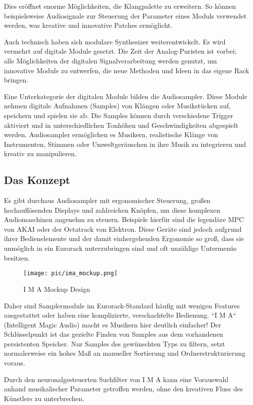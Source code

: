 	Dies eröffnet enorme Möglichkeiten, die Klangpalette zu erweitern. So können beispielsweise Audiosignale zur Steuerung der Parameter eines Moduls verwendet werden, was kreative und innovative Patches ermöglicht.
	
	Auch technisch haben sich modulare Synthesizer weiterentwickelt. 
	Es wird vermehrt auf digitale Module gesetzt. 
	Die Zeit der Analog-Puristen ist vorbei; alle Möglichkeiten der digitalen Signalverarbeitung werden genutzt, um innovative Module zu entwerfen, die neue Methoden und Ideen in das eigene Rack bringen.
	
	Eine Unterkategorie der digitalen Module bilden die Audiosampler. Diese Module nehmen digitale Aufnahmen (Samples) von Klängen oder Musikstücken auf, speichern und spielen sie ab. Die Samples können durch verschiedene Trigger aktiviert und in unterschiedlichen Tonhöhen und Geschwindigkeiten abgespielt werden. 
	Audiosampler ermöglichen es Musikern, realistische Klänge von Instrumenten, Stimmen oder Umweltgeräuschen in ihre Musik zu integrieren und kreativ zu manipulieren.
	
	\newpage
	\subsection{Das Konzept}
	
	Es gibt durchaus Audiosampler mit ergonomischer Steuerung, großen hochauflösenden Displays und zahlreichen Knöpfen, um diese komplexen Audiomaschinen angenehm zu steuern. 
	Beispiele hierfür sind die legendäre MPC von AKAI oder der Octatrack von Elektron. 
	Diese Geräte sind jedoch aufgrund ihrer Bedienelemente und der damit einhergehenden Ergonomie so groß, dass sie unmöglich in ein Eurorack unterzubringen sind und oft unzählige Untermenüs besitzen.
	
	\begin{wrapfigure}{r}{0.4\textwidth} %
		\vspace{-20pt + 0.02\textwidth}
		\hspace{0.02\textwidth} %
		\texttt{[image: pic/ima\_mockup.png]} %
		\caption{I M A Mockup Design}
		\vspace{-20pt}
	\end{wrapfigure}

	Daher sind Samplermodule im Eurorack-Standard häufig mit wenigen Features ausgestattet oder haben eine komplizierte, verschachtelte Bedienung. ``I M A`` (Intelligent Magic Audio) macht es Musikern hier deutlich einfacher! Der Schlüsselpunkt ist das gezielte Finden von Samples aus dem vorhandenen persistenten Speicher. Nur Samples des gewünschten Typs zu filtern, setzt normalerweise ein hohes Maß an manueller Sortierung und Ordnerstrukturierung voraus.
	
	
	Durch den neuronalgesteuerten Suchfilter von I M A kann eine Vorauswahl anhand musikalischer Parameter getroffen werden, ohne den kreativen Fluss des Künstlers zu unterbrechen.
	
	
	
	
